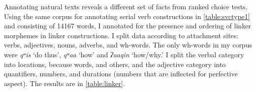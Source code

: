 \begin{comment}
\ex \label{speakingoutside1}
\begingl
\glpreamble ƛ̓aaʔaasḥiis ciiqmałap. //
\gla ƛ̓aaʔaas-(q)ḥ=(y)iis ciiqmałapa //
\glb outide-\textsc{link}=\textsc{weak.1sg} speak.publicly //
\glft `I'm speaking outside.' (\textbf{Q}, Sophie Billy) //
\endgl
\xe

\ex~ \label{speakingoutside2}
\begingl
\glpreamble ciiqmałapayiis hiłḥ ƛ̓aaʔaas. //
\gla ciiqmałapa=(y)iis hił-(q)ḥ ƛ̓aaʔaas //
\glb speak.publicly=\textsc{weak.1sg} be.at-\textsc{link} outside //
\glft `I'm speaking outside.' (\textbf{Q}, Sophie Billy) //
\endgl
\xe

\ex~ \label{*speakingoutside3}
\begingl
\glpreamble *ciiqmałapḥiis ƛ̓aaʔaas. //
\gla ciiqmałapa-(q)ḥ=(y)iis hił-(q)ḥ ƛ̓aaʔaas //
\glb speak.publicly-\textsc{link}=\textsc{weak.1sg} be.at-\textsc{link} outside //
\glft Intended: `I'm speaking outside.' (\textbf{Q}, Sophie Billy) //
\endgl
\xe
\end{comment}

Annotating natural texts reveals a different set of facts from ranked choice tests. Using the same corpus for annotating serial verb constructions in  \cref{table:svctype1} and consisting of 14167 words, I annotated for the presence and ordering of linker morphemes in linker constructions. I split data according to attachment sites: verbs, adjectives, nouns, adverbs, and wh-words. The only wh-words in my corpus were \textit{qʷis} `do thus', \textit{qʷaa} `how' and \textit{ʔaaqin} `how/why.' I split the verbal category into locations, because words, and others, and the adjective category into quantifiers, numbers, and durations (numbers that are inflected for perfective aspect). The results are in \cref{table:linker}.

